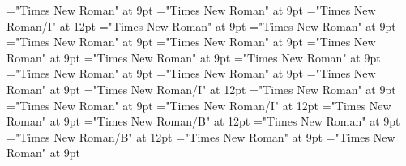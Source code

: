 \documentclass[gps1,twoside]{article}
\begin{document}
\font\exampleexampleexamplessensesensessubentrysubentriesentrybefore="Times New Roman" at 9pt
\font\spanexampleexampleexamplessensesensessubentrysubentriesentrylastchildafter="Times New Roman" at 9pt
\font\spanexampleexampleexamplessensesensessubentrysubentriesentry="Times New Roman/I" at 12pt
\font\translationtranslationtranslationsexampleexamplessensesensessubentrysubentriesentrybefore="Times New Roman" at 9pt
\font\spantranslationtranslationtranslationsexampleexamplessensesensessubentrysubentriesentrylastchildafter="Times New Roman" at 9pt
\font\encyclopedicinfosensesensessubentrysubentriesentrybefore="Times New Roman" at 9pt
\font\spanencyclopedicinfosensesensessubentrysubentriesentryfirstchildbefore="Times New Roman" at 9pt
\font\spanencyclopedicinfosensesensessubentrysubentriesentrylastchildafter="Times New Roman" at 9pt
\font\restrictionssensesensessubentrysubentriesentrybefore="Times New Roman" at 9pt
\font\spanrestrictionssensesensessubentrysubentriesentryfirstchildbefore="Times New Roman" at 9pt
\font\spanrestrictionssensesensessubentrysubentriesentrylastchildafter="Times New Roman" at 9pt
\font\lexsensereferencessensesensessubentrysubentriesentrybefore="Times New Roman" at 9pt
\font\lexsensereferencessensesensessubentrysubentriesentryafter="Times New Roman" at 9pt
\font\spanenownertypeabbreviationlexsensereferencelexsensereferencessensesensessubentrysubentriesentry="Times New Roman/I" at 12pt
\font\ownertypeabbreviationlexsensereferencelexsensereferencessensesensessubentrysubentriesentrybefore="Times New Roman" at 9pt
\font\spanownertypeabbreviationlexsensereferencelexsensereferencessensesensessubentrysubentriesentrylastchildafter="Times New Roman" at 9pt
\font\spanownertypeabbreviationlexsensereferencelexsensereferencessensesensessubentrysubentriesentry="Times New Roman/I" at 12pt
\font\configtargetconfigtargetconfigtargetslexsensereferencelexsensereferencessensesensessubentrysubentriesentrybefore="Times New Roman" at 9pt
\font\spanbzhheadwordconfigtargetconfigtargetslexsensereferencelexsensereferencessensesensessubentrysubentriesentry="Times New Roman/B" at 12pt
\font\headwordconfigtargetconfigtargetslexsensereferencelexsensereferencessensesensessubentrysubentriesentrybefore="Times New Roman" at 9pt
\font\spanheadwordconfigtargetconfigtargetslexsensereferencelexsensereferencessensesensessubentrysubentriesentry="Times New Roman/B" at 12pt
\font\variantformentrybackrefvariantformentrybackrefvariantformentrybackrefssensesensessubentrysubentriesentrybefore="Times New Roman" at 9pt
\font\variantformentrybackrefssensesensessubentrysubentriesentrybefore="Times New Roman" at 9pt
\end{document}
